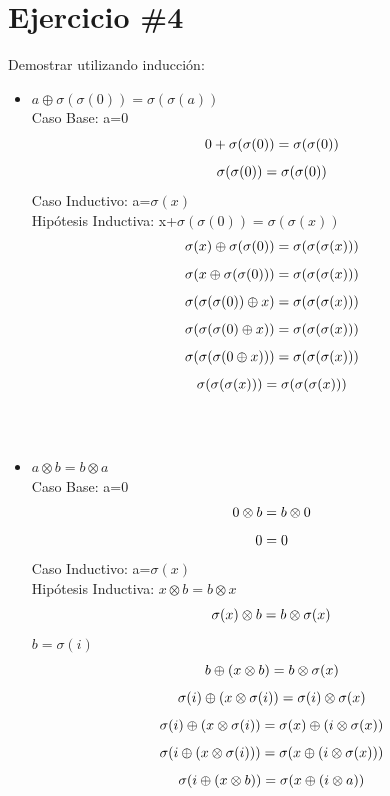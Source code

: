 \documentclass{article}
\begin{document}
\section*{Ejercicio \#4}
Demostrar utilizando inducci\'on:
\begin{itemize}
        \item{$a\oplus \sigma(\sigma(0))=\sigma(\sigma(a))$}\\
        \large{Caso Base:}
        a=0
\[
       0+\sigma(\sigma(0))=\sigma(\sigma(0))\\
\]
\[
       \sigma(\sigma(0))=\sigma(\sigma(0))\\
\]
\large{Caso Inductivo:}
a=$\sigma(x)$\\
Hipótesis Inductiva: 
x+$\sigma(\sigma(0))=\sigma(\sigma(x))$
\[
       \sigma(x)\oplus\sigma(\sigma(0))=\sigma(\sigma(\sigma(x)))\\
\]
\[
       \sigma(x\oplus\sigma(\sigma(0)))=\sigma(\sigma(\sigma(x)))\\
\]
\[
       \sigma(\sigma(\sigma(0))\oplus x)=\sigma(\sigma(\sigma(x)))\\
\]
\[
       \sigma(\sigma(\sigma(0)\oplus x))=\sigma(\sigma(\sigma(x)))\\
\]
\[
       \sigma(\sigma(\sigma(0\oplus x)))=\sigma(\sigma(\sigma(x)))\\
\]
\[
       \sigma(\sigma(\sigma(x)))=\sigma(\sigma(\sigma(x)))\\
\]
\\\\
        \item{$a \otimes b = b \otimes a$}\\
\large{Caso Base:}
a=0
\[
       0 \otimes b = b \otimes 0\\
\]
\[
       0 = 0\\
\]
\large{Caso Inductivo:}
a=$\sigma(x)$\\
Hipótesis Inductiva:
$x \otimes b = b \otimes x$
\[
      \sigma(x) \otimes b = b \otimes \sigma(x)\\
\]
$b=\sigma(i)$
\[
     b\oplus (x \otimes b) = b \otimes \sigma(x)\\
\]
\[
     \sigma(i)\oplus (x \otimes \sigma(i)) = \sigma(i) \otimes \sigma(x)\\
\]
\[
     \sigma(i)\oplus (x \otimes \sigma(i)) = \sigma(x)\oplus(i \otimes\sigma(x)) \\
\]
\[
     \sigma(i\oplus (x \otimes \sigma(i))) = \sigma(x\oplus(i \otimes\sigma(x))) \\
\]
\[
     \sigma(i\oplus (x \otimes b)) = \sigma(x\oplus(i \otimes a)) \\
\]
\end{itemize}
\end{document}
